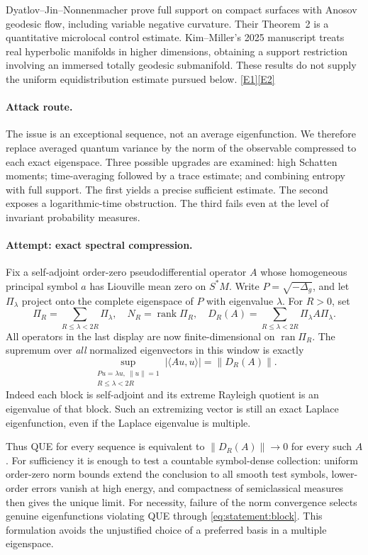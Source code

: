 \documentclass[11pt,a4paper]{article}
\newcommand{\eref}[2]{\hyperlink{extra:#1:#2}{[E#2]}}
\numberwithin{equation}{section}
\begin{document}
Dyatlov--Jin--Nonnenmacher prove full support on compact surfaces with
Anosov geodesic flow, including variable negative curvature. Their
Theorem~2 is a quantitative microlocal control estimate. Kim--Miller's
2025 manuscript treats real hyperbolic manifolds in higher dimensions,
obtaining a support restriction involving an immersed totally geodesic
submanifold. These results do not supply the uniform equidistribution
estimate pursued below. \eref{statement}{1}\eref{statement}{2}

\paragraph{Attack route.}
The issue is an exceptional sequence, not an average eigenfunction. We
therefore replace averaged quantum variance by the norm of the observable
compressed to each exact eigenspace. Three possible upgrades are examined:
high Schatten moments; time-averaging followed by a trace estimate; and
combining entropy with full support. The first yields a precise sufficient
estimate. The second exposes a logarithmic-time obstruction. The third
fails even at the level of invariant probability measures.

\paragraph{Attempt: exact spectral compression.}
Fix a self-adjoint order-zero pseudodifferential operator $A$ whose
homogeneous principal symbol $a$ has Liouville mean zero on $S^*M$.
Write $P=\sqrt{-\Delta_g}$, and let $\Pi_\lambda$ project onto the complete
eigenspace of $P$ with eigenvalue $\lambda$. For $R>0$, set
\[
 \Pi_R=\sum_{R\leq\lambda<2R}\Pi_\lambda,\quad
 N_R=\operatorname{rank}\Pi_R,\quad
 D_R(A)=\sum_{R\leq\lambda<2R}\Pi_\lambda A\Pi_\lambda.
\]
All operators in the last display are now finite-dimensional on
$\operatorname{ran}\Pi_R$. The supremum over \emph{all} normalized eigenvectors
in this window is exactly
\begin{equation}\label{eq:statement:block}
 \sup_{\substack{Pu=\lambda u,\ \|u\|=1\\ R\leq\lambda<2R}}
 |\langle Au,u\rangle|=\|D_R(A)\|.
\end{equation}
Indeed each block is self-adjoint and its extreme Rayleigh quotient is an
eigenvalue of that block. Such an extremizing vector is still an exact
Laplace eigenfunction, even if the Laplace eigenvalue is multiple.

Thus QUE for every sequence is equivalent to $\|D_R(A)\|\to0$ for every
such $A$. For sufficiency it is enough to test a countable symbol-dense
collection: uniform order-zero norm bounds extend the conclusion to all
smooth test symbols, lower-order errors vanish at high energy, and
compactness of semiclassical measures then gives the unique limit.
For necessity, failure of the norm convergence selects genuine
eigenfunctions violating QUE through \eqref{eq:statement:block}. This formulation
avoids the unjustified choice of a preferred basis in a multiple eigenspace.
\end{document}
